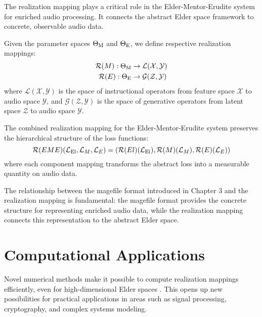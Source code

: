 The realization mapping plays a critical role in the Elder-Mentor-Erudite system for enriched audio processing. It connects the abstract Elder space framework to concrete, observable audio data.

\begin{definition}
Given the parameter spaces $\Theta_{\text{M}}$ and $\Theta_{\text{E}}$, we define respective realization mappings:
\begin{align}
\mathcal{R}(M): \Theta_{\text{M}} &\rightarrow \mathcal{L}(\mathcal{X}, \mathcal{Y}) \\
\mathcal{R}(E): \Theta_{\text{E}} &\rightarrow \mathcal{G}(\mathcal{Z}, \mathcal{Y})
\end{align}
where $\mathcal{L}(\mathcal{X}, \mathcal{Y})$ is the space of instructional operators from feature space $\mathcal{X}$ to audio space $\mathcal{Y}$, and $\mathcal{G}(\mathcal{Z}, \mathcal{Y})$ is the space of generative operators from latent space $\mathcal{Z}$ to audio space $\mathcal{Y}$.
\end{definition}

\begin{theorem}
The combined realization mapping for the Elder-Mentor-Erudite system preserves the hierarchical structure of the loss functions:
\begin{equation}
\mathcal{R}(EME)(\mathcal{L}_{\text{El}}, \mathcal{L}_M, \mathcal{L}_E) = (\mathcal{R}(El)(\mathcal{L}_{\text{El}}), \mathcal{R}(M)(\mathcal{L}_M), \mathcal{R}(E)(\mathcal{L}_E))
\end{equation}
where each component mapping transforms the abstract loss into a measurable quantity on audio data.
\end{theorem}

\begin{remark}
The relationship between the magefile format introduced in Chapter 3 and the realization mapping is fundamental: the magefile format provides the concrete structure for representing enriched audio data, while the realization mapping connects this representation to the abstract Elder space.
\end{remark}

\section{Computational Applications}

Novel numerical methods make it possible to compute realization mappings efficiently, even for high-dimensional Elder spaces \cite{elder_theory}. This opens up new possibilities for practical applications in areas such as signal processing, cryptography, and complex systems modeling.

